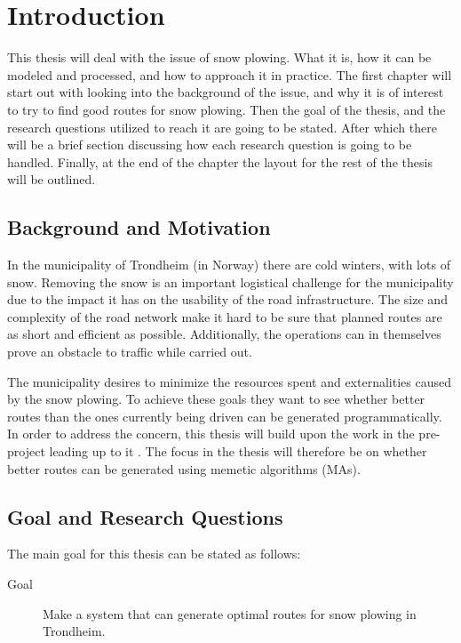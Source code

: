 \chapter{Introduction}
\label{cha:introduction}

This thesis will deal with the issue of snow plowing. What it is, how it can be modeled and processed, and how to approach it in practice. The first chapter will start out with looking into the background of the issue, and why it is of interest to try to find good routes for snow plowing. Then the goal of the thesis, and the research questions utilized to reach it are going to be stated. After which there will be a brief section discussing how each research question is going to be handled. Finally, at the end of the chapter the layout for the rest of the thesis will be outlined.

\section{Background and Motivation}

In the municipality of Trondheim (in Norway) there are cold winters, with lots of snow. Removing the snow is an important logistical challenge for the municipality due to the impact it has on the usability of the road infrastructure. The size and complexity of the road network make it hard to be sure that planned routes are as short and efficient as possible. Additionally, the operations can in themselves prove an obstacle to traffic while carried out.

The municipality desires to minimize the resources spent and externalities caused by the snow plowing. To achieve these goals they want to see whether better routes than the ones currently being driven can be generated programmatically. In order to address the concern, this thesis will build upon the work in the pre-project leading up to it \citep{forprosjektet}. The focus in the thesis will therefore be on whether better routes can be generated using memetic algorithms (MAs).

\section{Goal and Research Questions}
\label{sec:goal_and_research_questions}

The main goal for this thesis can be stated as follows:

\begin{description}
    \item [Goal] Make a system that can generate optimal routes for snow plowing in Trondheim.
\end{description}

